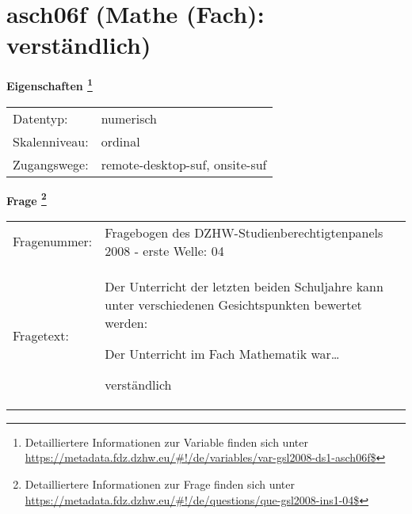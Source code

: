 
    \setcounter{footnote}{0}

    \vspace*{-1.8cm}
	\section{asch06f (Mathe (Fach): verständlich)}
	\label{section:asch06f}



    \vspace*{0.5cm}
    \noindent\textbf{Eigenschaften
	\footnote{Detailliertere Informationen zur Variable finden sich unter
		\url{https://metadata.fdz.dzhw.eu/\#!/de/variables/var-gsl2008-ds1-asch06f$}}}\\
	\begin{tabularx}{\hsize}{@{}lX}
	Datentyp: & numerisch \\
	Skalenniveau: & ordinal \\
	Zugangswege: &
	  remote-desktop-suf, 
	  onsite-suf
 \\
    \end{tabularx}



				\vspace*{0.5cm}
                \noindent\textbf{Frage
	                \footnote{Detailliertere Informationen zur Frage finden sich unter
		              \url{https://metadata.fdz.dzhw.eu/\#!/de/questions/que-gsl2008-ins1-04$}}}\\
				\begin{tabularx}{\hsize}{@{}lX}
					Fragenummer: &
					  Fragebogen des DZHW-Studienberechtigtenpanels 2008 - erste Welle:
					  04
 \\
					Fragetext: & Der Unterricht der letzten beiden Schuljahre kann unter verschiedenen Gesichtspunkten bewertet werden:\par  Der Unterricht im Fach Mathematik war…\par  verständlich \\
				\end{tabularx}





